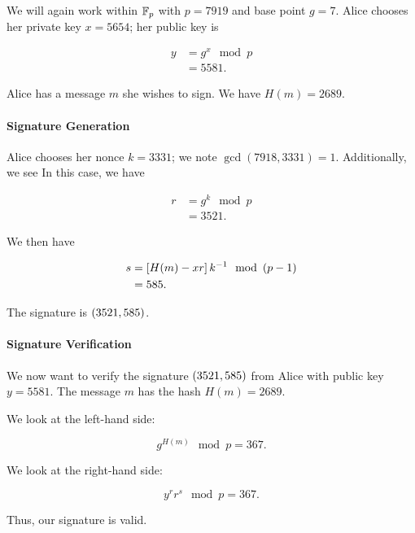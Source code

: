 \begin{example}

We will again work within $\mathbb{F}_{p}$ with $p = 7919$
and base point $g = 7$.
Alice chooses her private key $x=5654$;
her public key is

\begin{align}
    y &= g^{x} \mod p \nonumber\\
        &= 5581.
\end{align}

\noindent
Alice has a message $m$ she wishes to sign.
We have $H(m) = 2689$.

\paragraph{Signature Generation}
Alice chooses her \gls{nonce} $k=3331$;
we note $\gcd(7918, 3331) = 1$.
Additionally, we see
In this case, we have

\begin{align}
    r &= g^{k} \mod p \nonumber\\
        &= 3521.
\end{align}

\noindent
We then have

\begin{align}
    s &= \brackets{H(m) - xr}k^{-1} \mod \parens{p-1} \nonumber\\
        &= 585.
\end{align}

\noindent
The signature is $\left( 3521, 585 \right)$.

\paragraph{Signature Verification}
We now want to verify the signature $\left( 3521, 585 \right)$
from Alice with public key $y = 5581$.
The message $m$ has the hash $H(m) = 2689$.

We look at the left-hand side:

\begin{equation}
    g^{H(m)} \mod p = 367.
\end{equation}

\noindent
We look at the right-hand side:

\begin{equation}
    y^{r}r^{s} \mod p = 367.
\end{equation}

\noindent
Thus, our signature is valid.
\end{example}



